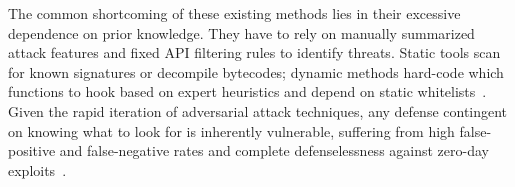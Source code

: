 The common shortcoming of these existing methods lies in their excessive dependence on prior knowledge. They have to rely on manually summarized attack features and fixed API filtering rules to identify threats.
Static tools scan for known signatures or decompile bytecodes; dynamic methods hard-code which functions to hook based on expert heuristics and depend on static whitelists~\cite{299852}. Given the rapid iteration of adversarial attack techniques, any defense contingent on knowing what to look for is inherently vulnerable, suffering from high false-positive and false-negative rates and complete defenselessness against zero-day exploits~\cite{GUO2023175, aghakhani}.






